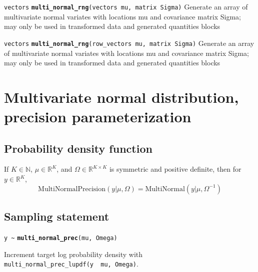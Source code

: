 \documentclass[
  10pt,
]{book}
\begin{document}

\texttt{vectors} \textbf{\texttt{multi\_normal\_rng}}\texttt{(vectors\ mu,\ matrix\ Sigma)}\newline
Generate an array of multivariate normal variates with locations mu
and covariance matrix Sigma; may only be used in transformed data and generated
quantities blocks


\texttt{vectors} \textbf{\texttt{multi\_normal\_rng}}\texttt{(row\_vectors\ mu,\ matrix\ Sigma)}\newline
Generate an array of multivariate normal variates with locations mu
and covariance matrix Sigma; may only be used in transformed data and generated
quantities blocks

\hypertarget{multivariate-normal-distribution-precision-parameterization}{%
\section{Multivariate normal distribution, precision parameterization}\label{multivariate-normal-distribution-precision-parameterization}}

\hypertarget{probability-density-function-26}{%
\subsection{Probability density function}\label{probability-density-function-26}}

If \(K \in \mathbb{N}\), \(\mu \in \mathbb{R}^K\), and \(\Omega \in \mathbb{R}^{K \times K}\) is symmetric and positive definite, then
for \(y \in \mathbb{R}^K\), \[ \text{MultiNormalPrecision}(y|\mu,\Omega)
= \text{MultiNormal}(y|\mu,\Omega^{-1}) \]

\hypertarget{sampling-statement-50}{%
\subsection{Sampling statement}\label{sampling-statement-50}}

\texttt{y\ \textasciitilde{}} \textbf{\texttt{multi\_normal\_prec}}\texttt{(mu,\ Omega)}

Increment target log probability density with \texttt{multi\_normal\_prec\_lupdf(y\ \textbar{}\ mu,\ Omega)}.
\end{document}
